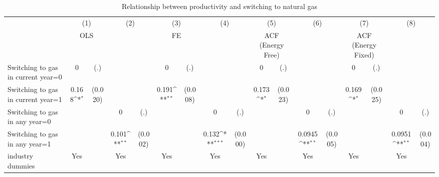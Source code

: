 \begin{table}[htbp]\centering
\def\sym#1{\ifmmode^{#1}\else\(^{#1}\)\fi}
\caption{Relationship between productivity and switching to natural gas}
\begin{tabular}{l*{8}{cc}}
\toprule
                    &\multicolumn{2}{c}{(1)}           &\multicolumn{2}{c}{(2)}           &\multicolumn{2}{c}{(3)}           &\multicolumn{2}{c}{(4)}           &\multicolumn{2}{c}{(5)}           &\multicolumn{2}{c}{(6)}           &\multicolumn{2}{c}{(7)}           &\multicolumn{2}{c}{(8)}           \\
                    &\multicolumn{2}{c}{OLS}           &\multicolumn{2}{c}{}              &\multicolumn{2}{c}{FE}            &\multicolumn{2}{c}{}              &\multicolumn{2}{c}{ACF (Energy Free)}&\multicolumn{2}{c}{}              &\multicolumn{2}{c}{ACF (Energy Fixed)}&\multicolumn{2}{c}{}              \\
\midrule
Switching to gas in current year=0&           0         &         (.)&                     &            &           0         &         (.)&                     &            &           0         &         (.)&                     &            &           0         &         (.)&                     &            \\
Switching to gas in current year=1&       0.168\sym{*}  &     (0.020)&                     &            &       0.191\sym{**} &     (0.008)&                     &            &       0.173\sym{*}  &     (0.023)&                     &            &       0.169\sym{*}  &     (0.025)&                     &            \\
Switching to gas in any year=0&                     &            &           0         &         (.)&                     &            &           0         &         (.)&                     &            &           0         &         (.)&                     &            &           0         &         (.)\\
Switching to gas in any year=1&                     &            &       0.101\sym{**} &     (0.002)&                     &            &       0.132\sym{***}&     (0.000)&                     &            &      0.0945\sym{**} &     (0.005)&                     &            &      0.0951\sym{**} &     (0.004)\\
industry dummies    &         Yes         &            &         Yes         &            &         Yes         &            &         Yes         &            &         Yes         &            &         Yes         &            &         Yes         &            &         Yes         &            \\

\end{tabular}
\end{table}
